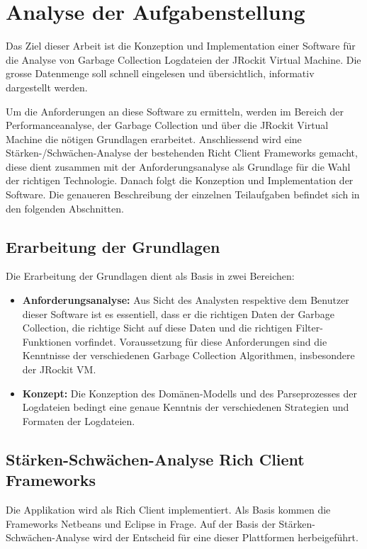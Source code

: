 \chapter{Analyse der Aufgabenstellung}\label{analyse_aufgabenstellung}
Das Ziel dieser Arbeit ist die Konzeption und Implementation einer Software für die Analyse von Garbage Collection Logdateien der JRockit Virtual Machine. Die grosse Datenmenge soll schnell eingelesen und übersichtlich, informativ dargestellt werden. 

Um die Anforderungen an diese Software zu ermitteln, werden im Bereich der Performanceanalyse, der Garbage Collection und über die JRockit Virtual Machine die nötigen Grundlagen erarbeitet. Anschliessend wird eine Stärken-/Schwächen-Analyse der bestehenden Richt Client Frameworks gemacht, diese dient zusammen mit der Anforderungsanalyse als Grundlage für die Wahl der richtigen Technologie. Danach folgt die Konzeption und Implementation der Software. Die genaueren Beschreibung der einzelnen Teilaufgaben befindet sich in den folgenden Abschnitten.

\section{Erarbeitung der Grundlagen}
Die Erarbeitung der Grundlagen dient als Basis in zwei Bereichen:
\begin{itemize}
	\item \textbf{Anforderungsanalyse:} Aus Sicht des Analysten respektive dem Benutzer dieser Software ist es essentiell, dass er die richtigen Daten der Garbage Collection, die richtige Sicht auf diese Daten und die richtigen Filter-Funktionen vorfindet. Voraussetzung für diese Anforderungen sind die Kenntnisse der verschiedenen Garbage Collection Algorithmen, insbesondere der JRockit VM. 
	\item \textbf{Konzept: } Die Konzeption des Domänen-Modells und des Parseprozesses der Logdateien bedingt eine genaue Kenntnis der verschiedenen Strategien und Formaten der Logdateien.
\end{itemize}

\section{Stärken-Schwächen-Analyse Rich Client Frameworks}
Die Applikation wird als Rich Client implementiert. Als Basis kommen die Frameworks Netbeans und Eclipse in Frage. Auf der Basis der Stärken-Schwächen-Analyse wird der Entscheid für eine dieser Plattformen herbeigeführt.


